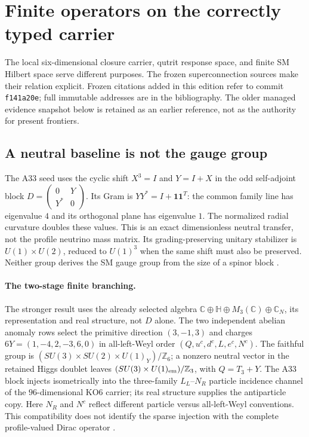 \documentclass[11pt]{article}
\begin{document}
\section{Finite operators on the correctly typed carrier}
\label{sec:finite-response}

The local six-dimensional closure carrier, qutrit response space, and finite
SM Hilbert space serve different purposes. The frozen superconnection sources
make their relation explicit. Frozen citations added in this edition refer to
commit \texttt{f141a20e}; full immutable addresses are in the bibliography.
The older managed evidence snapshot below is retained as an earlier reference,
not as the authority for present frontiers.

\subsection{A neutral baseline is not the gauge group}
\label{sec:fsba33}
The A33 seed uses the cyclic shift $X^3=I$ and $Y=I+X$ in the odd
self-adjoint block $D=\left(\begin{smallmatrix}0&Y\\Y^*&0\end{smallmatrix}\right)$.
Its Gram is $YY^*=I+\mathbf1\mathbf1^T$: the common family line has
eigenvalue $4$ and its orthogonal plane has eigenvalue $1$. The normalized
radial curvature doubles these values. This is an exact dimensionless
neutral transfer, not the profile neutrino mass matrix. Its grading-preserving
unitary stabilizer is $U(1)\times U(2)$, reduced to $U(1)^3$ when the same
shift must also be preserved. Neither group derives the SM gauge group from
the size of a spinor block \cite{FSBA33}.

\paragraph{The two-stage finite branching.}\label{sec:fsb02ab}
The stronger result uses the already selected algebra
$\mathbb C\oplus\mathbb H\oplus M_3(\mathbb C)\oplus\mathbb C_N$,
its representation and real structure, not $D$ alone. The two independent
abelian anomaly rows select the primitive direction $(3,-1,3)$ and charges
$6Y=(1,-4,2,-3,6,0)$ in all-left-Weyl order
$(Q,u^c,d^c,L,e^c,N^c)$. The faithful group is
$(SU(3)\times SU(2)\times U(1)_Y)/\mathbb Z_6$; a nonzero neutral vector
in the retained Higgs doublet leaves
$(SU(3)\times U(1)_{\rm em})/\mathbb Z_3$, with $Q=T_3+Y$.
The A33 block injects isometrically into the three-family $L_L$--$N_R$
particle incidence channel of the $96$-dimensional KO6 carrier; its real
structure supplies the antiparticle copy. Here $N_R$ and $N^c$ reflect
different particle versus all-left-Weyl conventions. This compatibility does
not identify the sparse injection with the complete profile-valued Dirac
operator \cite{FSB02ab}.
\end{document}
